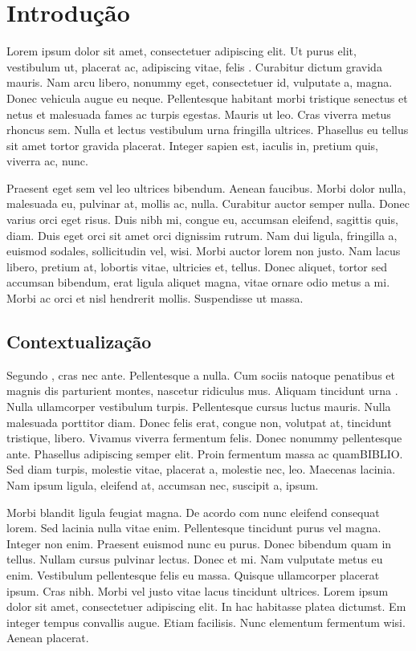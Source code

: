 %
%

\chapter{Introdu\c{c}\~{a}o}
Lorem ipsum dolor sit amet, consectetuer adipiscing elit. Ut purus elit, vestibulum ut,  placerat ac, adipiscing vitae, felis . Curabitur dictum gravida mauris. Nam arcu libero, nonummy eget, consectetuer id, vulputate a, magna. Donec vehicula augue eu neque. Pellentesque habitant morbi tristique senectus et netus et malesuada fames ac turpis egestas. Mauris ut leo. Cras viverra metus rhoncus sem. Nulla et lectus vestibulum urna fringilla ultrices. Phasellus eu tellus sit amet tortor gravida placerat. Integer sapien est, iaculis in, pretium quis, viverra ac, nunc.

Praesent eget sem vel leo ultrices bibendum. Aenean faucibus. Morbi dolor nulla, malesuada eu, pulvinar at, mollis ac, nulla. Curabitur auctor semper nulla. Donec varius orci eget risus. Duis nibh mi, congue eu, accumsan eleifend, sagittis quis, diam. Duis eget orci sit amet orci dignissim rutrum. Nam dui ligula, fringilla a, euismod sodales, sollicitudin vel, wisi. Morbi auctor lorem non justo. Nam lacus libero, pretium at, lobortis vitae, ultricies et, tellus. Donec aliquet, tortor sed accumsan bibendum, erat ligula aliquet magna, vitae ornare odio metus a mi. Morbi ac orci et nisl hendrerit mollis. Suspendisse ut massa.

\section{Contextualiza\c{c}\~{a}o}
Segundo , cras nec ante. Pellentesque a nulla. Cum sociis natoque penatibus et magnis dis parturient montes, nascetur ridiculus mus. Aliquam tincidunt urna . Nulla ullamcorper vestibulum turpis. Pellentesque cursus luctus mauris. Nulla malesuada porttitor diam. Donec felis erat, congue non, volutpat at, tincidunt tristique, libero. Vivamus viverra fermentum felis. Donec nonummy pellentesque ante. Phasellus adipiscing semper elit. Proin fermentum massa ac quamBIBLIO. Sed diam turpis, molestie vitae, placerat a, molestie nec, leo. Maecenas lacinia. Nam ipsum ligula, eleifend at, accumsan nec, suscipit a, ipsum.

Morbi blandit ligula feugiat magna. De acordo com   nunc eleifend consequat lorem. Sed lacinia nulla vitae enim. Pellentesque tincidunt purus vel magna. Integer non enim. Praesent euismod nunc eu purus. Donec bibendum quam in tellus. Nullam cursus pulvinar lectus. Donec et mi. Nam vulputate metus eu enim. Vestibulum pellentesque felis eu massa. Quisque ullamcorper placerat ipsum. Cras nibh. Morbi vel justo vitae lacus tincidunt ultrices. Lorem ipsum dolor sit amet, consectetuer adipiscing elit. In hac habitasse platea dictumst. Em integer tempus convallis augue. Etiam facilisis. Nunc elementum fermentum wisi. Aenean placerat.

